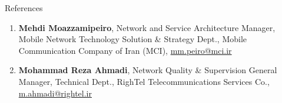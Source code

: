 \documentclass{resume}
\begin{document}
\begin{rSection}{References}
\begin{enumerate}[left=-4mm]
\item \textbf{Mehdi Moazzamipeiro}, Network and Service Architecture Manager, Mobile Network Technology Solution \& Strategy Dept., Mobile Communication Company of Iran (MCI), \href{https://www.linkedin.com/in/mehdi-moazzamipeiro-9088a734/}{} \href{https://www.mci.ir/web/en/home}{} \href{mmpeiro@yahoo.com}{mm.peiro@mci.ir}
\item \textbf{Mohammad Reza Ahmadi}, Network Quality \& Supervision General Manager, Technical Dept., RighTel Telecommunications Services Co., \href{https://www.linkedin.com/in/mohammad-reza-ahmadi-bidhendi/}{} \href{https://www.rightel.ir/en/home}{} \href{mailto:mohammad.reze.ahmadi@gmail.com}{m.ahmadi@rightel.ir}
\end{enumerate}
\end{rSection}
\end{document}
